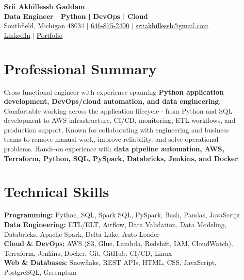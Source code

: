 \documentclass[letterpaper,10pt]{article}
\begin{document}
\fontsize{9.35pt}{10.45pt}\selectfont

\begin{center}
    {\LARGE \textbf{Srii Akhillessh Gaddam}} \\[-1pt]
    \textbf{Data Engineer | Python | DevOps | Cloud} \\[2pt]
    Southfield, Michigan 48034 $|$
    \href{tel:6468752400}{646-875-2400} $|$
    \href{mailto:sriiakhillessh@gmail.com}{sriiakhillessh@gmail.com} \\[1pt]
    \href{https://www.linkedin.com/in/srii-akhiilessh-gaddam-b48668191/}{LinkedIn} $|$
    \href{https://sriiakhillesshg.github.io/portfolio/}{Portfolio}
\end{center}
\vspace{-8pt}

\section{Professional Summary}
\small{Cross-functional engineer with experience spanning \textbf{Python application development, DevOps/cloud automation, and data engineering}. Comfortable working across the application lifecycle - from Python and SQL development to AWS infrastructure, CI/CD, monitoring, ETL workflows, and production support. Known for collaborating with engineering and business teams to remove manual work, improve reliability, and solve operational problems. Hands-on experience with \textbf{data pipeline automation, AWS, Terraform, Python, SQL, PySpark, Databricks, Jenkins, and Docker}.}

\section{Technical Skills}
\small{
\textbf{Programming:} Python, SQL, Spark SQL, PySpark, Bash, Pandas, JavaScript \\
\textbf{Data Engineering:} ETL/ELT, Airflow, Data Validation, Data Modeling, Databricks, Apache Spark, Delta Lake, Auto Loader \\
\textbf{Cloud \& DevOps:} AWS (S3, Glue, Lambda, Redshift, IAM, CloudWatch), Terraform, Jenkins, Docker, Git, GitHub, CI/CD, Linux \\
\textbf{Web \& Databases:} Snowflake, REST APIs, HTML, CSS, JavaScript, PostgreSQL, Greenplum
}

\end{document}
